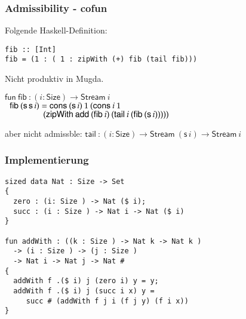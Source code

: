 \documentclass[12pt,red,serif,mathserif]{beamer}
\newcommand{\s}{\mathsf{s}\,}
\newcommand{\Size}{\mathsf{Size}}
\newcommand{\fun}{\mathsf{fun}\:}
\newcommand{\add}{\mathsf{add}\:}
\newcommand{\cons}{\mathsf{cons}\:}
\newcommand{\Stream}{\mathsf{Stream}\:}
\newcommand{\tail}{\mathsf{tail}\:}
\newenvironment{bsp}
{\begin{list}{}{
\setlength{\leftmargin}{0cm}
\setlength{\rightmargin}{0cm}
}\item}{
\end {list}
}
\newcommand{\zipWith}{\mathsf{zipWith}\:}
\newcommand{\fib}{\mathsf{fib}\:}
\newcommand{\ra}{\rightarrow}
\newcommand{\spc}{\hspace*{2mm}}
\newcommand{\spcx}{\hspace*{8mm}}
\begin{document}
\begin{frame}[fragile]

\frametitle{ Admissibility - cofun }

\begin{itemize}
\item
Folgende Haskell-Definition:
\begin{bsp}
\begin{verbatim}
fib :: [Int]
fib = (1 : ( 1 : zipWith (+) fib (tail fib)))
\end{verbatim}
\end{bsp}
\vspace*{0.1cm}
\item
Nicht produktiv in Mugda.
\item
\begin{bsp}
$\fun \fib : (i : \Size ) \ra \Stream i$\\
$\spc \fib (\s \s i) = \cons (\s i) \: 1 \: (\cons i \: 1 \: $\\
$\spcx \spcx (\zipWith \add (\fib i) \: (\tail i \: (\fib (\s i)))))$
\end{bsp}
\item
\begin{bsp}
aber nicht admissble: $\tail : (i : \Size ) \ra \Stream (\s i) \ra \Stream i $\\
\end{bsp}
\end{itemize}

\end{frame}



\begin{frame}[fragile]

  \frametitle{Implementierung}

\begin{verbatim}
sized data Nat : Size -> Set
{
  zero : (i: Size ) -> Nat ($ i);
  succ : (i : Size ) -> Nat i -> Nat ($ i)
}

fun addWith : ((k : Size ) -> Nat k -> Nat k ) 
  -> (i : Size ) -> (j : Size ) 
  -> Nat i -> Nat j -> Nat #
{
  addWith f .($ i) j (zero i) y = y; 
  addWith f .($ i) j (succ i x) y = 
     succ # (addWith f j i (f j y) (f i x)) 
}
\end{verbatim}

\end{frame}
\end{document}
